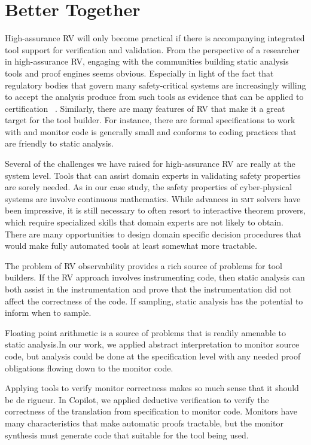 \section{Better Together}\label{sec:oportunities} 
High-assurance RV will only become practical if there is accompanying
integrated tool support for verification and validation.  From the
perspective of a researcher in high-assurance RV, engaging with the
communities building static analysis tools and proof engines seems
obvious.  Especially in light of the fact that regulatory bodies that
govern many safety-critical systems are increasingly willing to accept
the analysis produce from such tools as evidence that can be applied to
certification ~\cite{DO333}. Similarly, there are many features of RV
that make it a great target for the tool builder. For instance, there are formal
specifications to work with  and monitor code is generally small and
conforms to coding practices that are friendly to static analysis. 

 
Several of the challenges we have raised for high-assurance RV are
really at the system level. Tools that can assist domain experts in
validating safety properties are sorely needed.  As in our case study,
the safety properties of cyber-physical systems are involve continuous
mathematics. While advances in \textsc{smt} solvers have been
impressive, it is still necessary to often resort to interactive
theorem provers, which require specialized skills that domain experts
are not likely to obtain. There are many opportunities to design
domain specific decision procedures that would make fully automated
tools at least somewhat more tractable.  

The problem of RV observability provides a rich source of problems for tool builders. If the RV
approach involves instrumenting code, then static analysis can both
assist in the instrumentation and prove that the instrumentation did
not affect the correctness of the code. If sampling, static analysis
has the potential to inform when to sample.

Floating point arithmetic
is a source of problems that is readily amenable to static analysis.In
our work, we applied abstract interpretation to monitor source code,
but  analysis could be done at the specification level with any needed
proof obligations flowing down to the monitor code. 

Applying tools to verify monitor correctness makes so much sense that
it should be de rigueur.  In Copilot, we applied deductive
verification to verify the correctness of the translation from
specification to monitor code.  Monitors have many characteristics
that make automatic proofs tractable, but the monitor synthesis must
generate code that suitable for the tool being used.   